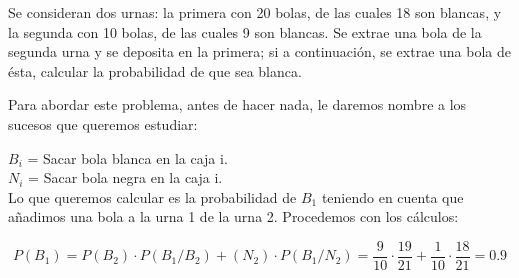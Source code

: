 \problem

Se consideran dos urnas: la primera con 20 bolas, de las cuales  18 son blancas, y  la segunda con 10 bolas, de las cuales  9  son  blancas.  Se extrae una bola de la segunda urna y  se  deposita  en  la  primera; si a continuaci{\'o}n, se extrae una bola de {\'e}sta,  calcular  la  probabilidad  de que sea blanca.

Para abordar este problema, antes de hacer nada, le daremos nombre a los sucesos que queremos estudiar:

$B_{i}$ = Sacar bola blanca en la caja i.\\
$N_{i}$ = Sacar bola negra en la caja i.\\

Lo que queremos calcular es la probabilidad de $B_{1}$ teniendo en cuenta que añadimos una bola a la urna 1 de la  urna 2. Procedemos con los cálculos:

\begin{equation*}
    P(B_{1}) = P(B_{2}) \cdot P(B_{1}/B_{2}) + (N_{2}) \cdot P(B_{1}/N_{2}) = \dfrac{9}{10} \cdot \dfrac{19}{21} + \dfrac{1}{10} \cdot \dfrac{18}{21} = 0.9
\end{equation*}
